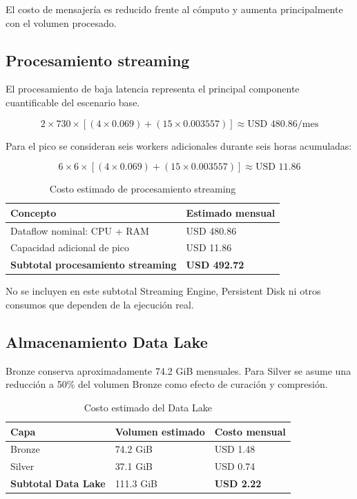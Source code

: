 \documentclass[11pt,a4paper]{article}
\begin{document}
El costo de mensajería es reducido frente al cómputo y aumenta principalmente con el volumen procesado.

\subsection{Procesamiento streaming}
El procesamiento de baja latencia representa el principal componente cuantificable del escenario base.

\[
2\times730\times[(4\times0.069)+(15\times0.003557)]
\approx \text{USD }480.86/\text{mes}
\]

Para el pico se consideran seis workers adicionales durante seis horas acumuladas:

\[
6\times6\times[(4\times0.069)+(15\times0.003557)]
\approx \text{USD }11.86
\]

\begin{table}[H]
\caption{Costo estimado de procesamiento streaming}\label{tab:costo-dataflow}
\small
\begin{tabularx}{\linewidth}{@{}XY@{}}\toprule
Concepto & Estimado mensual\\\midrule
Dataflow nominal: CPU + RAM & USD 480.86\\
Capacidad adicional de pico & USD 11.86\\
\textbf{Subtotal procesamiento streaming} & \textbf{USD 492.72}\\\bottomrule
\end{tabularx}
\end{table}

No se incluyen en este subtotal Streaming Engine, Persistent Disk ni otros consumos que dependen de la ejecución real.

\subsection{Almacenamiento Data Lake}
Bronze conserva aproximadamente 74.2 GiB mensuales. Para Silver se asume una reducción a 50\% del volumen Bronze como efecto de curación y compresión.

\begin{table}[H]
\caption{Costo estimado del Data Lake}\label{tab:costo-datalake}
\small
\begin{tabularx}{\linewidth}{@{}P{.35\linewidth}P{.30\linewidth}Y@{}}\toprule
Capa & Volumen estimado & Costo mensual\\\midrule
Bronze & 74.2 GiB & USD 1.48\\
Silver & 37.1 GiB & USD 0.74\\
\textbf{Subtotal Data Lake} & 111.3 GiB & \textbf{USD 2.22}\\\bottomrule
\end{tabularx}
\end{table}
\end{document}
